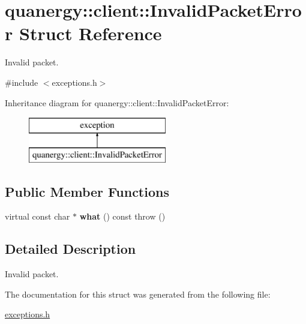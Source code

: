 \hypertarget{structquanergy_1_1client_1_1InvalidPacketError}{\section{quanergy\-:\-:client\-:\-:Invalid\-Packet\-Error Struct Reference}
\label{structquanergy_1_1client_1_1InvalidPacketError}
}


Invalid packet.  




{\ttfamily \#include $<$exceptions.\-h$>$}

Inheritance diagram for quanergy\-:\-:client\-:\-:Invalid\-Packet\-Error\-:\begin{figure}[H]
\begin{center}
\leavevmode
\includegraphics[height=2.000000cm]{structquanergy_1_1client_1_1InvalidPacketError}
\end{center}
\end{figure}
\subsection*{Public Member Functions}
\begin{DoxyCompactItemize}
\item 
\hypertarget{structquanergy_1_1client_1_1InvalidPacketError_a6fd9a698e1217fd84ab1eb0c44d46648}{virtual const char $\ast$ {\bfseries what} () const   throw ()}\label{structquanergy_1_1client_1_1InvalidPacketError_a6fd9a698e1217fd84ab1eb0c44d46648}

\end{DoxyCompactItemize}


\subsection{Detailed Description}
Invalid packet. 

The documentation for this struct was generated from the following file\-:\begin{DoxyCompactItemize}
\item 
\hyperlink{exceptions_8h}{exceptions.\-h}\end{DoxyCompactItemize}
